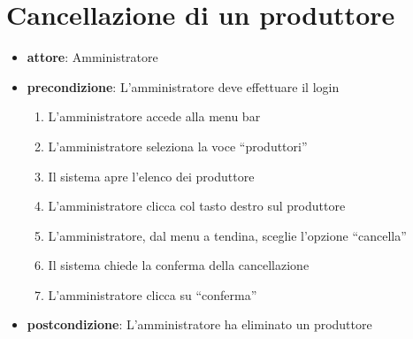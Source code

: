 \section{Cancellazione di un produttore}
\begin{itemize}
	\item \textbf{attore}: Amministratore
	\item \textbf{precondizione}: L’amministratore deve effettuare il login
	
	\begin{enumerate}
		\item L’amministratore accede alla menu bar
		\item L’amministratore seleziona la voce “produttori”
		\item Il sistema apre l’elenco dei produttore
		\item L’amministratore clicca col tasto destro sul produttore
		\item L’amministratore, dal menu a tendina, sceglie l’opzione “cancella”
		\item Il sistema chiede la conferma della cancellazione
		\item L’amministratore clicca su “conferma”
	\end{enumerate}

	\item \textbf{postcondizione}: L’amministratore ha eliminato un produttore
\end{itemize}


